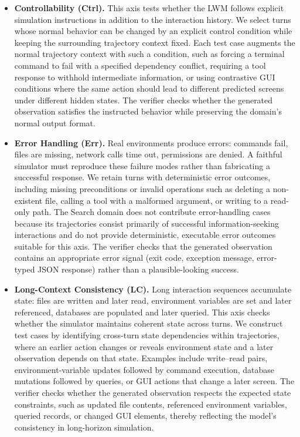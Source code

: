 \documentclass{llmxive}
\begin{document}
\begin{itemize}[leftmargin=1.5em,itemsep=2pt]
    \item \textbf{Controllability (Ctrl).}
    This axis tests whether the LWM follows explicit simulation instructions in addition to the interaction history.
    We select turns whose normal behavior can be changed by an explicit control condition while keeping the surrounding trajectory context fixed.
    Each test case augments the normal trajectory context with such a condition, such as forcing a terminal command to fail with a specified dependency conflict, requiring a tool response to withhold intermediate information, or using contrastive GUI conditions where the same action should lead to different predicted screens under different hidden states.
    The verifier checks whether the generated observation satisfies the instructed behavior while preserving the domain's normal output format.

    \item \textbf{Error Handling (Err).}
    Real environments produce errors: commands fail, files are missing, network calls time out, permissions are denied.
    A faithful simulator must reproduce these failure modes rather than fabricating a successful response.
    We retain turns with deterministic error outcomes, including missing preconditions or invalid operations such as deleting a non-existent file, calling a tool with a malformed argument, or writing to a read-only path.
    The Search domain does not contribute error-handling cases because its trajectories consist primarily of successful information-seeking interactions and do not provide deterministic, executable error outcomes suitable for this axis.
    The verifier checks that the generated observation contains an appropriate error signal (exit code, exception message, error-typed JSON response) rather than a plausible-looking success.

    \item \textbf{Long-Context Consistency (LC).}
    Long interaction sequences accumulate state: files are written and later read, environment variables are set and later referenced, databases are populated and later queried.
    This axis checks whether the simulator maintains coherent state across turns.
    We construct test cases by identifying cross-turn state dependencies within trajectories, where an earlier action changes or reveals environment state and a later observation depends on that state.
    Examples include write--read pairs, environment-variable updates followed by command execution, database mutations followed by queries, or GUI actions that change a later screen.
    The verifier checks whether the generated observation respects the expected state constraints, such as updated file contents, referenced environment variables, queried records, or changed GUI elements, thereby reflecting the model's consistency in long-horizon simulation.
\end{itemize}
\end{document}
